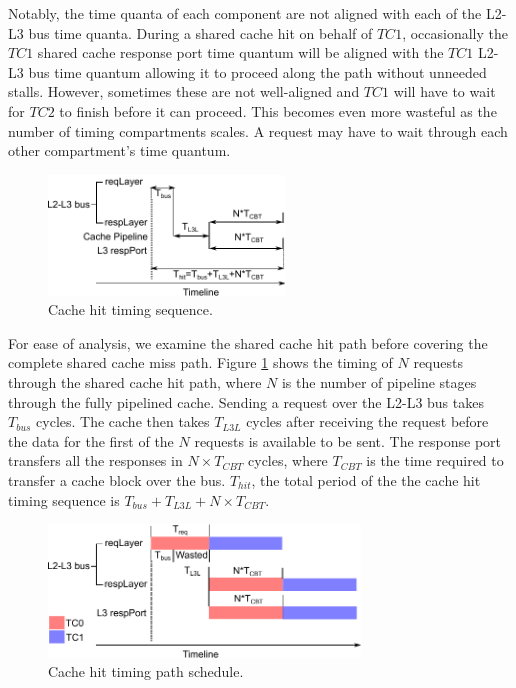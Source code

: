 Notably, the time quanta of each component are not aligned with each of the 
L2-L3 bus time quanta.  During a shared cache hit on behalf of $TC1$, 
occasionally the $TC1$ shared cache response port time quantum will be aligned 
with the $TC1$ L2-L3 bus time quantum allowing it to proceed along the path 
without unneeded stalls.  However, sometimes these are not well-aligned and 
$TC1$ will have to wait for $TC2$ to finish before it can proceed. This becomes 
even more wasteful
as the number of timing compartments scales. A request may have to wait through 
each other compartment's time quantum. 

\begin{figure}
    \begin{center}
        \includegraphics[width=2.4675in]{figs/hit_timing.pdf}
        \caption{Cache hit timing sequence.}
        \label{fig:hit_timing}
    \end{center}
\end{figure}

For ease of analysis, we examine the shared cache hit path before covering the 
complete shared cache miss path. Figure \ref{fig:hit_timing} shows the timing 
of $N$ requests through the shared cache hit path, where $N$ is the number of 
pipeline stages through the fully pipelined cache. Sending a request over the 
L2-L3 bus takes $T_{bus}$ cycles.  The cache then takes $T_{L3L}$ cycles after 
receiving the request before the data for the first of the $N$ requests is 
available to be sent. The response port transfers all the responses in $N\times 
T_{CBT}$ cycles, where $T_{CBT}$ is the time required to transfer a cache block 
over the bus. $T_{hit}$, the total period of the the cache hit timing sequence 
is $T_{bus}+T_{L3L}+N\times T_{CBT}$.

\begin{figure}
    \begin{center}
        \includegraphics[width=3.2624in]{figs/hit_schedule.pdf}
        \caption{Cache hit timing path schedule.}
        \label{fig:hit_schedule}
    \end{center}
\end{figure}

